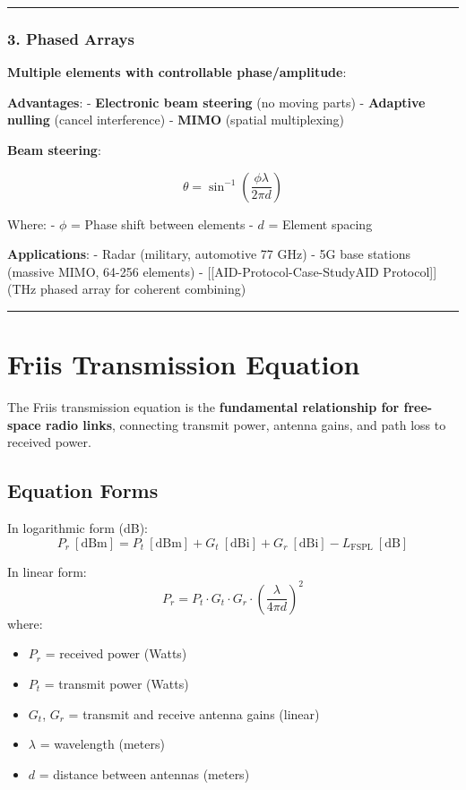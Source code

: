 \begin{center}\rule{0.5\linewidth}{0.5pt}\end{center}

\subsubsection{3. Phased Arrays}\label{phased-arrays}

\textbf{Multiple elements with controllable phase/amplitude}:

\textbf{Advantages}: - \textbf{Electronic beam steering} (no moving
parts) - \textbf{Adaptive nulling} (cancel interference) - \textbf{MIMO}
(spatial multiplexing)

\textbf{Beam steering}:

\[
\theta = \sin^{-1}\left(\frac{\phi \lambda}{2\pi d}\right)
\]

Where: - \(\phi\) = Phase shift between elements - \(d\) = Element
spacing

\textbf{Applications}: - Radar (military, automotive 77 GHz) - 5G base
stations (massive MIMO, 64-256 elements) -
{[}{[}AID-Protocol-Case-Study\textbar AID Protocol{]}{]} (THz phased
array for coherent combining)

\begin{center}\rule{0.5\linewidth}{0.5pt}\end{center}

\section{Friis Transmission Equation}

The Friis transmission equation is the \textbf{fundamental relationship for free-space radio links}, connecting transmit power, antenna gains, and path loss to received power.

\subsection{Equation Forms}

In logarithmic form (dB):
\begin{equation}
P_r\ [\text{dBm}] = P_t\ [\text{dBm}] + G_t\ [\text{dBi}] + G_r\ [\text{dBi}] - L_{\text{FSPL}}\ [\text{dB}]
\label{eq:friis-db}
\end{equation}

In linear form:
\begin{equation}
P_r = P_t \cdot G_t \cdot G_r \cdot \left(\frac{\lambda}{4\pi d}\right)^2
\label{eq:friis-linear}
\end{equation}
where:
\begin{itemize}
\item $P_r$ = received power (Watts)
\item $P_t$ = transmit power (Watts)
\item $G_t$, $G_r$ = transmit and receive antenna gains (linear)
\item $\lambda$ = wavelength (meters)
\item $d$ = distance between antennas (meters)
\end{itemize}

